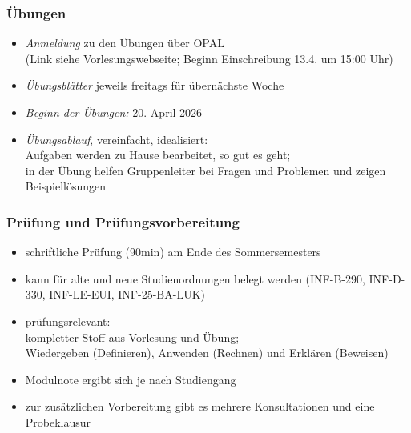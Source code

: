 \documentclass[aspectratio=1610,onlymath]{beamer}
\begin{document}
\begin{frame}\frametitle{Übungen}
\begin{itemize}
\item \emph{Anmeldung} zu den Übungen über OPAL \\(Link siehe Vorlesungswebseite; Beginn Einschreibung 13.4. um 15:00 Uhr)
\item \emph{Übungsblätter} jeweils freitags für übernächste Woche
\item \emph{Beginn der Übungen:} 20. April 2026
\item \emph{Übungsablauf}, vereinfacht, idealisiert:\\
	Aufgaben werden zu Hause bearbeitet, so gut es geht;\\
	in der Übung helfen Gruppenleiter bei Fragen und Problemen und zeigen Beispiellösungen
\end{itemize}

\end{frame}


\begin{frame}\frametitle{Prüfung und Prüfungsvorbereitung}
\begin{itemize}
\item schriftliche Prüfung (90min) am Ende des Sommersemesters
\item kann für alte und neue Studienordnungen belegt werden (INF-B-290, INF-D-330, INF-LE-EUI, INF-25-BA-LUK)
\item prüfungsrelevant:\\
	kompletter Stoff aus Vorlesung \alert{und} Übung;\\
	Wiedergeben (Definieren), Anwenden (Rechnen) und Erklären (Beweisen)
\item Modulnote ergibt sich je nach Studiengang
\item zur zusätzlichen Vorbereitung gibt es \alert{mehrere Konsultationen} und \alert{eine Probeklausur}
\end{itemize}

\end{frame}
\end{document}
